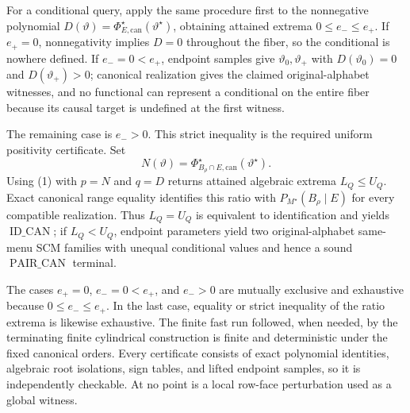 For a conditional query, apply the same procedure first to the nonnegative polynomial \(D(\vartheta)=\Phi_{E,\mathrm{can}}^\star(\vartheta^\star)\), obtaining attained extrema \(0\leq e_-\leq e_+\).  If \(e_+=0\), nonnegativity implies \(D=0\) throughout the fiber, so the conditional is nowhere defined.  If \(e_-=0<e_+\), endpoint samples give \(\vartheta_0,\vartheta_+\) with \(D(\vartheta_0)=0\) and \(D(\vartheta_+)>0\); canonical realization gives the claimed original-alphabet witnesses, and no functional can represent a conditional on the entire fiber because its causal target is undefined at the first witness.

The remaining case is \(e_->0\).  This strict inequality is the required uniform positivity certificate.  Set
\[
N(\vartheta)=\Phi_{B_\rho\cap E,\mathrm{can}}^\star(\vartheta^\star).
\]
Using (1) with \(p=N\) and \(q=D\) returns attained algebraic extrema \(L_Q\leq U_Q\).  Exact canonical range equality identifies this ratio with \(P_{M^\star}(B_\rho\mid E)\) for every compatible realization.  Thus \(L_Q=U_Q\) is equivalent to identification and yields \(\operatorname{ID\_CAN}\); if \(L_Q<U_Q\), endpoint parameters yield two original-alphabet same-menu SCM families with unequal conditional values and hence a sound \(\operatorname{PAIR\_CAN}\) terminal.

The cases \(e_+=0\), \(e_-=0<e_+\), and \(e_->0\) are mutually exclusive and exhaustive because \(0\leq e_-\leq e_+\).  In the last case, equality or strict inequality of the ratio extrema is likewise exhaustive.  The finite fast run followed, when needed, by the terminating finite cylindrical construction is finite and deterministic under the fixed canonical orders.  Every certificate consists of exact polynomial identities, algebraic root isolations, sign tables, and lifted endpoint samples, so it is independently checkable.  At no point is a local row-face perturbation used as a global witness.